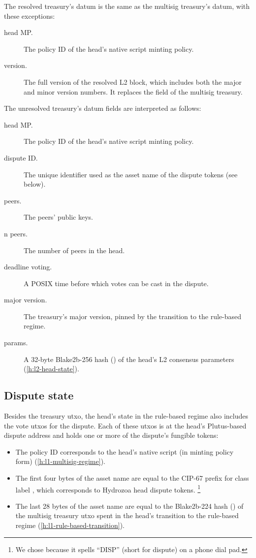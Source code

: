 \documentclass[../hydrozoa.tex]{subfiles}
\begin{document}
The resolved treasury's datum is the same as the multisig treasury's datum, with these exceptions:
\begin{description}
  \item[head MP.] The policy ID of the head's native script minting policy.
  \item[version.] The full version of the resolved L2 block, which includes both the major and minor version numbers.
  It replaces the  field of the multisig treasury.
\end{description}

The unresolved treasury's datum fields are interpreted as follows:
\begin{description}
  \item[head MP.] The policy ID of the head's native script minting policy.
  \item[dispute ID.] The unique identifier used as the asset name of the dispute tokens (see below).
  \item[peers.] The peers' public keys.
  \item[n peers.] The number of peers in the head.
  \item[deadline voting.] A POSIX time before which votes can be cast in the dispute.
  \item[major version.] The treasury's major version, pinned by the transition to the rule-based regime.
  \item[params.] A 32-byte Blake2b-256 hash () of the head's L2 consensus parameters (\cref{h:l2-head-state}).
\end{description}

\subsection{Dispute state}%
\label{h:l1-rule-based-dispute-state}%

Besides the treasury utxo, the head's state in the rule-based regime also includes the vote utxos for the dispute.
Each of these utxos is at the head's Plutus-based dispute address and holds one or more of the dispute's fungible tokens:
\begin{itemize}
  \item The policy ID corresponds to the head's native script (in minting policy form) (\cref{h:l1-multisig-regime}).
  \item The first four bytes of the asset name are equal to the CIP-67
    \citep{AlessandroKonradThomasVellekoopCIP67AssetName2022}
    prefix for class label \headDisputeToken{}, which corresponds to Hydrozoa head dispute tokens.%
    \footnote{We chose \headDisputeToken{} because it spells ``DISP'' (short for dispute) on a phone dial pad.}
  \item The last 28 bytes of the asset name are equal to the Blake2b-224 hash () of the multisig treasury utxo spent in the head's transition to the rule-based regime (\cref{h:l1-rule-based-transition}).
\end{itemize}
\end{document}
